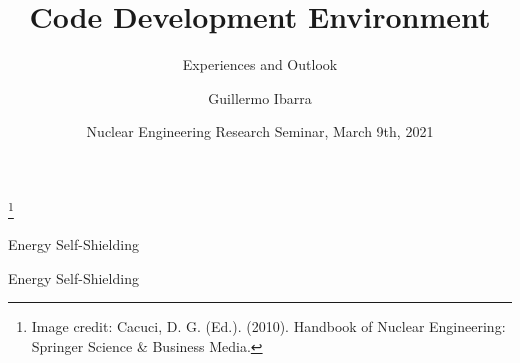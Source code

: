 \documentclass[sans,mathserif,aspectratio=169]{beamer}
\title{Code Development Environment}
\subtitle{Experiences and Outlook}
\author[Guillermo Ibarra]{Guillermo Ibarra}
\date{Nuclear Engineering Research Seminar, March 9th, 2021}
\newcommand\blfootnote[1]{%
  \begingroup
  \renewcommand\thefootnote{}\footnote{#1}%
  \addtocounter{footnote}{-1}%
  \endgroup
}
\begin{document}
\begin{frame}
\titlepage
\end{frame}

\begin{frame}
\centering
{}
\blfootnote{Image credit: Cacuci, D. G. (Ed.). (2010). Handbook of Nuclear Engineering:  Springer Science \& Business Media. }
\end{frame}

\begin{frame}{Energy Self-Shielding}
  \centering
\end{frame}

\begin{frame}{Energy Self-Shielding}
  \centering
\end{frame}
\end{document}
